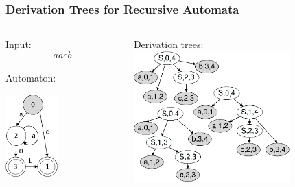 \documentclass{beamer}
\begin{document}
	\begin{frame} 
		\frametitle{Derivation Trees for Recursive Automata}
		\begin{columns}
			\begin{column}{5cm}
				Input: $$aacb$$ \\
				\vspace{10pt}
				Automaton: \\
				\vspace{5pt}
				\begin{center}
					\includegraphics[width=2cm]{pictures/G0minimizedAutomaton.pdf}
				\end{center}
			\end{column}
		
     		\begin{column}{6cm}
     			Derivation trees:\\
     			\vspace{5pt}
     			\includegraphics[width=6cm]{pictures/G0trees.pdf}
			\end{column}
		
		\end{columns}

	\end{frame}
	
\end{document}
